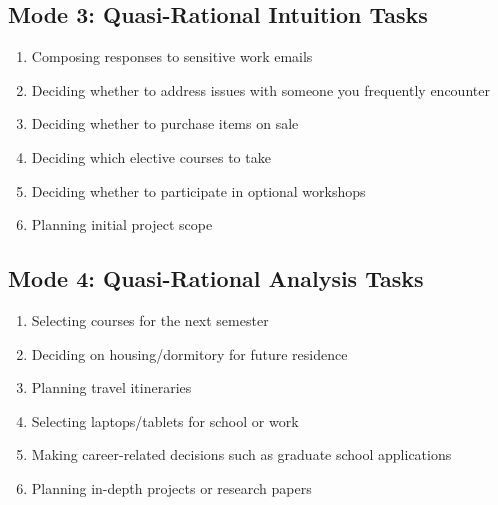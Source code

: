 \subsection{Mode 3: Quasi-Rational Intuition Tasks}
\begin{enumerate}
    \item Composing responses to sensitive work emails
    \item Deciding whether to address issues with someone you frequently encounter
    \item Deciding whether to purchase items on sale
    \item Deciding which elective courses to take
    \item Deciding whether to participate in optional workshops
    \item Planning initial project scope
\end{enumerate}

\subsection{Mode 4: Quasi-Rational Analysis Tasks}
\begin{enumerate}
    \item Selecting courses for the next semester
    \item Deciding on housing/dormitory for future residence
    \item Planning travel itineraries
    \item Selecting laptops/tablets for school or work
    \item Making career-related decisions such as graduate school applications
    \item Planning in-depth projects or research papers
\end{enumerate}
